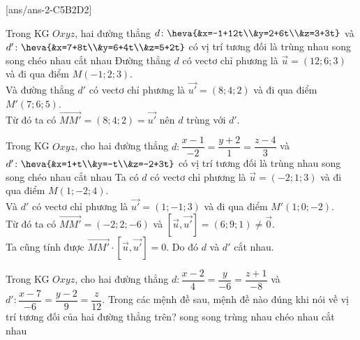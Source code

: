 [ans/ans-2-C5B2D2]
\TN
\begin{ex}%
	Trong KG $Oxyz$, hai đường thẳng $d \colon \heva{&x=-1+12t\\&y=2+6t\\&z=3+3t}$ và  $d' \colon \heva{&x=7+8t\\&y=6+4t\\&z=5+2t}$ có vị trí tương đối là
	\choice
	{\True trùng nhau}
	{song song}
	{chéo nhau}
	{cắt nhau}
	\loigiai
	{Đường thẳng $d$ có vectơ chỉ phương là  $\overrightarrow{u}=(12;6;3)$ và đi qua điểm $M(-1;2;3)$.\\
		Và đường thẳng $d'$ có vectơ chỉ phương là  $\overrightarrow{u'}=(8;4;2)$ và đi qua điểm $M'(7;6;5)$.\\
		Từ đó ta có $\overrightarrow{MM'}=(8;4;2)=\overrightarrow{u'}$ nên $d$ trùng với $d'$.}
\end{ex}
\begin{ex}%
	Trong KG $Oxyz$, cho hai đường thẳng $d \colon \dfrac{x-1}{-2}=\dfrac{y+2}{1}=\dfrac{z-4}{3}$ và  $ d' \colon \heva{&x=1+t\\&y=-t\\&z=-2+3t}$ có vị trí tương đối là
	\choice
	{trùng nhau}
	{song song}
	{chéo nhau}
	{\True  cắt nhau}
	\loigiai
	{Ta có 	$d$ có vectơ chỉ phương là  $\overrightarrow{u}=(-2;1;3)$ và đi qua điểm $M(1;-2;4)$.\\
		Và $d'$ có vectơ chỉ phương là  $\overrightarrow{u'}=(1;-1;3)$ và đi qua điểm $M'(1;0;-2)$.\\
		Từ đó ta có $\overrightarrow{MM'}=(-2;2;-6)$ và $ \left[\overrightarrow{u},\overrightarrow{u'} \right]=(6;9;1)\ne \overrightarrow{0}$. \\
		Ta cũng tính được $ \overrightarrow{MM'} \cdot \left[\overrightarrow{u},\overrightarrow{u'} \right]=0$. Do đó $d$ và $d'$ cắt nhau.}
\end{ex}
\begin{ex}%
	Trong KG $Oxyz$, cho hai đường thẳng $d\colon \dfrac{x-2}{4}=\dfrac{y}{-6}=\dfrac{z+1}{-8}$ và $d'\colon \dfrac{x-7}{-6}=\dfrac{y-2}{9}=\dfrac{z}{12}$. Trong các mệnh đề sau, mệnh đề nào đúng khi nói về vị trí tương đối của hai đường thẳng trên?
	\choice
	{\True song song}
	{trùng nhau}
	c{héo nhau}
	{cắt nhau}
\end{ex}
